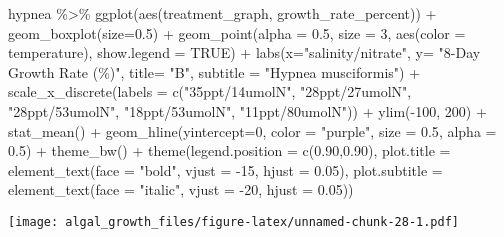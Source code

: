 \documentclass[
]{article}
\newenvironment{Shaded}{\begin{snugshade}}{\end{snugshade}}
\newcommand{\AttributeTok}[1]{\textcolor[rgb]{0.77,0.63,0.00}{#1}}
\newcommand{\ConstantTok}[1]{\textcolor[rgb]{0.00,0.00,0.00}{#1}}
\newcommand{\DecValTok}[1]{\textcolor[rgb]{0.00,0.00,0.81}{#1}}
\newcommand{\FloatTok}[1]{\textcolor[rgb]{0.00,0.00,0.81}{#1}}
\newcommand{\FunctionTok}[1]{\textcolor[rgb]{0.00,0.00,0.00}{#1}}
\newcommand{\NormalTok}[1]{#1}
\newcommand{\SpecialCharTok}[1]{\textcolor[rgb]{0.00,0.00,0.00}{#1}}
\newcommand{\StringTok}[1]{\textcolor[rgb]{0.31,0.60,0.02}{#1}}
\begin{document}
\begin{Shaded}
\begin{Highlighting}[]
\NormalTok{hypnea }\SpecialCharTok{\%\textgreater{}\%} \FunctionTok{ggplot}\NormalTok{(}\FunctionTok{aes}\NormalTok{(treatment\_graph, growth\_rate\_percent)) }\SpecialCharTok{+} 
  \FunctionTok{geom\_boxplot}\NormalTok{(}\AttributeTok{size=}\FloatTok{0.5}\NormalTok{) }\SpecialCharTok{+} 
  \FunctionTok{geom\_point}\NormalTok{(}\AttributeTok{alpha =} \FloatTok{0.5}\NormalTok{, }\AttributeTok{size =} \DecValTok{3}\NormalTok{, }\FunctionTok{aes}\NormalTok{(}\AttributeTok{color =}\NormalTok{ temperature), }\AttributeTok{show.legend =} \ConstantTok{TRUE}\NormalTok{) }\SpecialCharTok{+} 
  \FunctionTok{labs}\NormalTok{(}\AttributeTok{x=}\StringTok{"salinity/nitrate"}\NormalTok{, }\AttributeTok{y=} \StringTok{"8{-}Day Growth Rate (\%)"}\NormalTok{, }\AttributeTok{title=} \StringTok{"B"}\NormalTok{, }\AttributeTok{subtitle =} \StringTok{"Hypnea musciformis"}\NormalTok{) }\SpecialCharTok{+} 
  \FunctionTok{scale\_x\_discrete}\NormalTok{(}\AttributeTok{labels =} \FunctionTok{c}\NormalTok{(}\StringTok{"35ppt/14umolN"}\NormalTok{, }\StringTok{"28ppt/27umolN"}\NormalTok{, }\StringTok{"28ppt/53umolN"}\NormalTok{, }\StringTok{"18ppt/53umolN"}\NormalTok{, }\StringTok{"11ppt/80umolN"}\NormalTok{)) }\SpecialCharTok{+} 
  \FunctionTok{ylim}\NormalTok{(}\SpecialCharTok{{-}}\DecValTok{100}\NormalTok{, }\DecValTok{200}\NormalTok{) }\SpecialCharTok{+} \FunctionTok{stat\_mean}\NormalTok{() }\SpecialCharTok{+} 
  \FunctionTok{geom\_hline}\NormalTok{(}\AttributeTok{yintercept=}\DecValTok{0}\NormalTok{, }\AttributeTok{color =} \StringTok{"purple"}\NormalTok{, }\AttributeTok{size =} \FloatTok{0.5}\NormalTok{, }\AttributeTok{alpha =} \FloatTok{0.5}\NormalTok{) }\SpecialCharTok{+}
  \FunctionTok{theme\_bw}\NormalTok{() }\SpecialCharTok{+}
  \FunctionTok{theme}\NormalTok{(}\AttributeTok{legend.position =} \FunctionTok{c}\NormalTok{(}\FloatTok{0.90}\NormalTok{,}\FloatTok{0.90}\NormalTok{), }\AttributeTok{plot.title =} \FunctionTok{element\_text}\NormalTok{(}\AttributeTok{face =} \StringTok{"bold"}\NormalTok{, }\AttributeTok{vjust =} \SpecialCharTok{{-}}\DecValTok{15}\NormalTok{, }\AttributeTok{hjust =} \FloatTok{0.05}\NormalTok{), }\AttributeTok{plot.subtitle =} \FunctionTok{element\_text}\NormalTok{(}\AttributeTok{face =} \StringTok{"italic"}\NormalTok{, }\AttributeTok{vjust =} \SpecialCharTok{{-}}\DecValTok{20}\NormalTok{, }\AttributeTok{hjust =} \FloatTok{0.05}\NormalTok{))}
\end{Highlighting}
\end{Shaded}

\texttt{[image: algal\_growth\_files/figure-latex/unnamed-chunk-28-1.pdf]}
\end{document}
